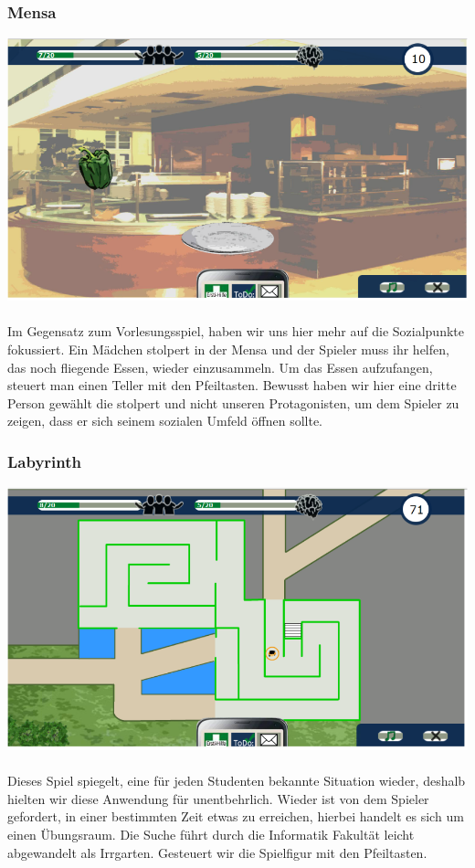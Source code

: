 \documentclass[a4paper, 11pt]{article} %
\begin{document}
\subsubsection{Mensa}
\includegraphics[scale=0.535]{images/spiel/8.png}\\\\
Im Gegensatz zum Vorlesungsspiel, haben wir uns hier mehr auf die Sozialpunkte fokussiert. Ein Mädchen stolpert in der Mensa und der Spieler muss ihr helfen, das noch fliegende Essen, wieder einzusammeln. Um das Essen aufzufangen, steuert man einen Teller mit den Pfeiltasten. Bewusst haben wir hier eine dritte Person gewählt die stolpert und nicht unseren Protagonisten, um dem Spieler zu zeigen, dass er sich seinem sozialen Umfeld öffnen sollte. 
\subsubsection{Labyrinth}
\includegraphics[scale=0.535]{images/spiel/9.png}\\\\
Dieses Spiel spiegelt, eine für jeden Studenten bekannte Situation wieder, deshalb hielten wir diese Anwendung für unentbehrlich. Wieder ist von dem Spieler gefordert, in einer bestimmten Zeit etwas zu erreichen, hierbei handelt es sich um einen Übungsraum. Die Suche führt durch die Informatik Fakultät leicht abgewandelt als Irrgarten. Gesteuert wir die Spielfigur mit den Pfeiltasten.
\end{document}
